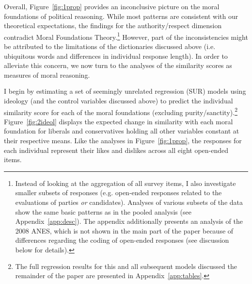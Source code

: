 \documentclass[12pt]{article}
\begin{document}
Overall, Figure~\ref{fig:1prop} provides an inconclusive picture on the moral foundations of political reasoning. While most patterns are consistent with our theoretical expectations, the findings for the authority/respect dimension contradict Moral Foundations Theory.\footnote{Instead of looking at the aggregation of all survey items, I also investigate smaller subsets of responses (e.g. open-ended responses related to the evaluations of parties \textit{or} candidates). Analyses of various subsets of the data show the same basic patterns as in the pooled analysis (see Appendix~\ref{app:desc}). The appendix additionally presents an analysis of the 2008 ANES, which is not shown in the main part of the paper because of differences regarding the coding of open-ended responses (see discussion below for details).} However, part of the inconsistencies might be attributed to the limitations of the dictionaries discussed above (i.e. ubiquitous words and differences in individual response length). In order to alleviate this concern, we now turn to the analyses of the similarity scores as measures of moral reasoning.

I begin by estimating a set of seemingly unrelated regression (SUR) models using ideology (and the control variables discussed above) to predict the individual similarity score for each of the moral foundations (excluding purity/sanctity).\footnote{The full regression results for this and all subsequent models discussed the remainder of the paper are presented in Appendix~\ref{app:tables}.} Figure~\ref{fig:2ideol} displays the expected change in similarity with each moral foundation for liberals and conservatives holding all other variables constant at their respective means. Like the analyses in Figure~\ref{fig:1prop}, the responses for each individual represent their likes and dislikes across all eight open-ended items.
\end{document}

